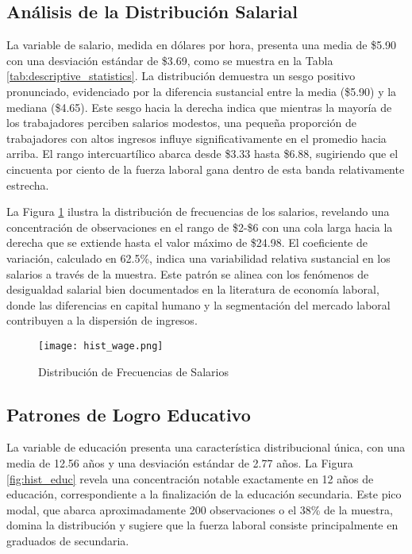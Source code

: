 \documentclass[12pt]{article}
\begin{document}
%

\subsection{Análisis de la Distribución Salarial}

La variable de salario, medida en dólares por hora, presenta una media de \$5.90 con una desviación estándar de \$3.69, como se muestra en la Tabla \ref{tab:descriptive_statistics}. La distribución demuestra un sesgo positivo pronunciado, evidenciado por la diferencia sustancial entre la media (\$5.90) y la mediana (\$4.65). Este sesgo hacia la derecha indica que mientras la mayoría de los trabajadores perciben salarios modestos, una pequeña proporción de trabajadores con altos ingresos influye significativamente en el promedio hacia arriba. El rango intercuartílico abarca desde \$3.33 hasta \$6.88, sugiriendo que el cincuenta por ciento de la fuerza laboral gana dentro de esta banda relativamente estrecha.

La Figura \ref{fig:hist_wage} ilustra la distribución de frecuencias de los salarios, revelando una concentración de observaciones en el rango de \$2-\$6 con una cola larga hacia la derecha que se extiende hasta el valor máximo de \$24.98. El coeficiente de variación, calculado en 62.5\%, indica una variabilidad relativa sustancial en los salarios a través de la muestra. Este patrón se alinea con los fenómenos de desigualdad salarial bien documentados en la literatura de economía laboral, donde las diferencias en capital humano y la segmentación del mercado laboral contribuyen a la dispersión de ingresos.

\begin{figure}[H]
\centering
\texttt{[image: hist\_wage.png]}
\caption{Distribución de Frecuencias de Salarios}
\label{fig:hist_wage}
\end{figure}

\subsection{Patrones de Logro Educativo}

La variable de educación presenta una característica distribucional única, con una media de 12.56 años y una desviación estándar de 2.77 años. La Figura \ref{fig:hist_educ} revela una concentración notable exactamente en 12 años de educación, correspondiente a la finalización de la educación secundaria. Este pico modal, que abarca aproximadamente 200 observaciones o el 38\% de la muestra, domina la distribución y sugiere que la fuerza laboral consiste principalmente en graduados de secundaria.
\end{document}
